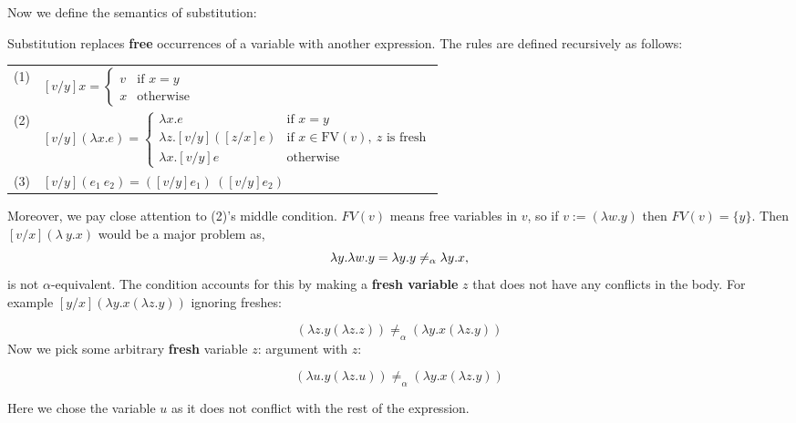 \noindent
Now we define the semantics of substitution:
\begin{Def}

    \label{def:substitution}
    
    Substitution replaces \textbf{free} occurrences of a variable with another expression. The rules are defined recursively as follows:
    
    \begin{center}
        \begin{tabular}{@{}l@{\quad}l@{}}
        (1) & \hspace{2em}
        $[v/y]x = 
        \begin{cases}
        v & \text{if } x = y \\
        x & \text{otherwise}
        \end{cases}$ \\[1em]
        
        (2) & \hspace{0em}
        $[v/y](\lambda x. e) = 
        \begin{cases}
        \lambda x. e & \text{if } x = y \\
        \lambda z. [v/y]([z/x]e) & \text{if } x \in \text{FV}(v),\ z \text{ is fresh} \\
        \lambda x. [v/y]e & \text{otherwise}
        \end{cases}$ \\[1em]
        
        (3) & \hspace{-.2em}
        $[v/y](e_1\ e_2) = ([v/y]e_1)\ ([v/y]e_2)$
        \end{tabular}
    \end{center}
    
    \noindent
    Moreover, we pay close attention to (2)'s middle condition.
    $FV(v)$ means free variables in $v$,
    so if $v:=(\lambda w.y)$ then $FV(v)=\{y\}$.
    Then $[v/x](\lambda\ y.x)$ would be a major problem as,
    \LARGE
    $$\Large \lambda y.\lambda w.y = \lambda y.y \neq_\alpha \lambda y.x,$$
    \normalsize
    is not $\alpha$-equivalent. The condition accounts for
    this by making a \textbf{fresh variable} $z$ that does not have any
    conflicts in the body. For example $[y/x](\lambda y.x(\lambda z.y))$ ignoring freshes:
    
    \vspace{-1em}
    \LARGE
    $$ (\lambda z.y(\lambda z.z)) \neq_\alpha (\lambda y.x(\lambda z.y))$$
    \normalsize
    Now we pick some arbitrary \textbf{fresh} variable $z$:
    argument with $z$:

    \vspace{-1em}
    \LARGE
    $$ (\lambda u.y(\lambda z.u)) \neq_\alpha (\lambda y.x(\lambda z.y))$$
    \normalsize

    \noindent
    Here we chose the variable $u$ as it does not conflict with the rest of the expression.
\end{Def}
